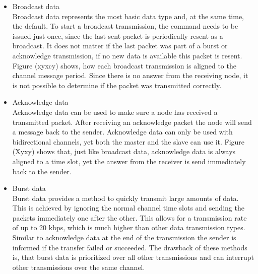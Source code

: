 \begin{itemize}
	\item{Broadcast data} \hfill \\ Broadcast data represents the most basic data type and, at the same time, the default. To start a broadcast transmission, the command needs to be issued just once, since the last sent packet is periodically resent as a broadcast. It does not matter if the last packet was part of a burst or acknowledge transmission, if no new data is available this packet is resent. Figure (xyxcy) shows, how each broadcast transmission is aligned to the channel message period.	Since there is no answer from the receiving node, it is not possible to determine if the packet was transmitted correctly.

	\item{Acknowledge data} \hfill \\ Acknowledge data can be used to make sure a node has received a transmitted packet. After receiving an acknowledge packet the node will send a message back to the sender. Acknowledge data can only be used with bidirectional channels, yet both the master and the slave can use it. Figure (Xyxy) shows that, just like broadcast data, acknowledge data is always aligned to a time slot, yet the answer from the receiver is send immediately back to the sender.
	
	\item{Burst data} \hfill \\ Burst data provides a method to quickly transmit large amounts of data. This is achieved by ignoring the normal channel time slots and sending the packets immediately one after the other. This allows for a transmission rate of up to 20 kbps, which is much higher than other data transmission types. Similar to acknowledge data at the end of the transmission the sender is informed if the transfer failed or succeeded. The drawback of these methods is, that burst data is prioritized over all other transmissions and can interrupt other transmissions over the same channel.
\end{itemize}

